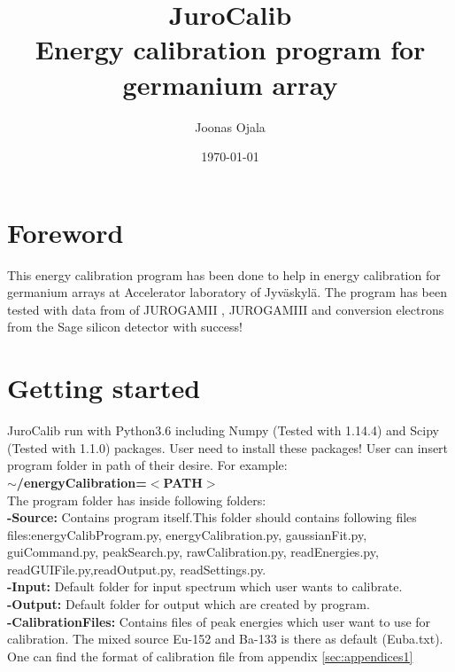 \documentclass{article}
\title{JuroCalib\\ Energy calibration program for germanium array}
\date{\today} %
\author{Joonas Ojala}
\begin{document}
\maketitle %



\section{Foreword}
This energy calibration program has been done to help in energy calibration for germanium arrays at Accelerator laboratory of Jyväskylä. The program has been tested with data from of JUROGAMII , JUROGAMIII and conversion electrons from the Sage silicon detector with success!  


\section{Getting started}
JuroCalib run with Python3.6 including Numpy (Tested with 1.14.4) and Scipy (Tested with 1.1.0) packages. User need to install these packages! User can insert program folder in path of their desire. 
For example:\\
\textbf{ $\sim$/energyCalibration=$<$PATH$>$ }\\
The program folder has inside following folders:\\
\textbf{ -Source: } Contains program itself.This folder should contains following files files:energyCalibProgram.py, energyCalibration.py, gaussianFit.py, guiCommand.py, peakSearch.py, rawCalibration.py, readEnergies.py, readGUIFile.py,readOutput.py, readSettings.py.\\
\textbf{ -Input: } Default folder for input spectrum which user wants to calibrate.\\
\textbf{ -Output: } Default folder for output which are created by program.\\
\textbf{ -CalibrationFiles: } Contains files of peak energies which user want to use for calibration. The mixed source Eu-152 and Ba-133 is there as default (Euba.txt). One can find the format of calibration file from appendix  \ref{sec:appendices1}\\
\end{document}
